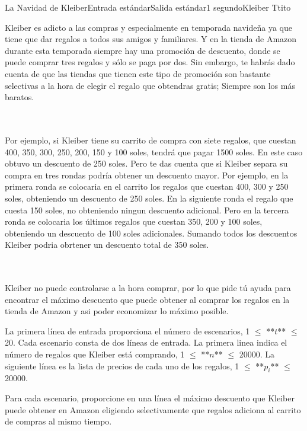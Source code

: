 \begin{problem}{La Navidad de Kleiber}{Entrada estándar}{Salida estándar}{1 segundo}{}{Kleiber Ttito}

Kleiber es adicto a las compras y especialmente en temporada navideña ya que tiene que dar regalos a todos sus amigos y familiares. Y en la tienda de Amazon durante esta temporada siempre hay una promoción de descuento, donde se puede comprar tres regalos y sólo se paga por dos. Sin embargo, te habrás dado cuenta de que las tiendas que tienen este tipo de promoción son bastante selectivas a la hora de elegir el regalo que obtendras gratis; Siempre son los más baratos.

\\ \\

Por ejemplo, si Kleiber tiene su carrito de compra con siete regalos, que cuestan 400, 350, 300, 250, 200, 150 y 100 soles, tendrá que pagar 1500 soles. En este caso obtuvo un descuento de 250 soles. Pero te das cuenta que si Kleiber separa su compra en tres rondas podría obtener un descuento mayor. Por ejemplo, en la primera ronda se colocaria en el carrito los regalos que cuestan 400, 300 y 250 soles, obteniendo un descuento de 250 soles. En la siguiente ronda el regalo que cuesta 150 soles, no obteniendo ningun descuento adicional. Pero en la tercera ronda se colocaria los últimos regalos que cuestan 350, 200 y 100 soles, obteniendo un descuento de 100 soles adicionales. Sumando todos los descuentos Kleiber podria obrtener un descuento total de 350 soles.

\\\\

Kleiber no puede controlarse a la hora comprar, por lo que pide tú ayuda para encontrar el máximo descuento que puede obtener al comprar los regalos en la tienda de Amazon y asi poder economizar lo máximo posible.

\InputFile

La primera línea de entrada proporciona el número de escenarios, 1 $\leq$ **$t$** $\leq$ 20. Cada escenario consta de dos líneas de entrada. La primera linea indica el número de regalos que Kleiber está comprando, 1 $\leq$ **$n$** $\leq$ 20000. La siguiente línea es la lista de precios de cada uno de los regalos, 1 $\leq$ **$p_i$** $\leq$ 20000.

\OutputFile

Para cada escenario, proporcione en una línea el máximo descuento que Kleiber puede obtener en Amazon eligiendo selectivamente que regalos adiciona al carrito de compras al mismo tiempo.

\Example

\begin{example}
\end{example}

\vspace{0.5cm}


\end{problem}

